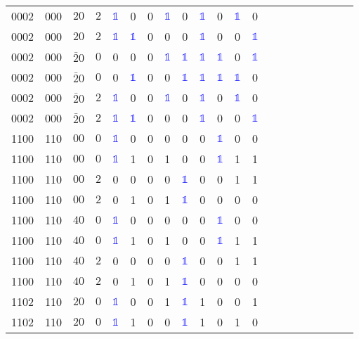 \begin{longtable*}{c| cccccccccccccccccccc }
0002& 000& $20$& $2$& \textcolor{blue}{$\mathds{1}$}& 0& 0& \textcolor{blue}{$\mathds{1}$}& 0& \textcolor{blue}{$\mathds{1}$}& 0& \textcolor{blue}{$\mathds{1}$}& 0\\
0002& 000& $20$& $2$& \textcolor{blue}{$\mathds{1}$}& \textcolor{blue}{$\mathds{1}$}& 0& 0& 0& \textcolor{blue}{$\mathds{1}$}& 0& 0& \textcolor{blue}{$\mathds{1}$}\\
0002& 000& $\bar{2}0$& $0$& 0& 0& 0& \textcolor{blue}{$\mathds{1}$}& \textcolor{blue}{$\mathds{1}$}& \textcolor{blue}{$\mathds{1}$}& \textcolor{blue}{$\mathds{1}$}& 0& \textcolor{blue}{$\mathds{1}$}\\
0002& 000& $\bar{2}0$& $0$& 0& \textcolor{blue}{$\mathds{1}$}& 0& 0& \textcolor{blue}{$\mathds{1}$}& \textcolor{blue}{$\mathds{1}$}& \textcolor{blue}{$\mathds{1}$}& \textcolor{blue}{$\mathds{1}$}& 0\\
0002& 000& $\bar{2}0$& $2$& \textcolor{blue}{$\mathds{1}$}& 0& 0& \textcolor{blue}{$\mathds{1}$}& 0& \textcolor{blue}{$\mathds{1}$}& 0& \textcolor{blue}{$\mathds{1}$}& 0\\
0002& 000& $\bar{2}0$& $2$& \textcolor{blue}{$\mathds{1}$}& \textcolor{blue}{$\mathds{1}$}& 0& 0& 0& \textcolor{blue}{$\mathds{1}$}& 0& 0& \textcolor{blue}{$\mathds{1}$}\\
1100& 110& $00$& $0$& \textcolor{blue}{$\mathds{1}$}& 0& 0& 0& 0& 0& \textcolor{blue}{$\mathds{1}$}& 0& 0\\
1100& 110& $00$& $0$& \textcolor{blue}{$\mathds{1}$}& 1& 0& 1& 0& 0& \textcolor{blue}{$\mathds{1}$}& 1& 1\\
1100& 110& $00$& $2$& 0& 0& 0& 0& \textcolor{blue}{$\mathds{1}$}& 0& 0& 1& 1\\
1100& 110& $00$& $2$& 0& 1& 0& 1& \textcolor{blue}{$\mathds{1}$}& 0& 0& 0& 0\\
1100& 110& $40$& $0$& \textcolor{blue}{$\mathds{1}$}& 0& 0& 0& 0& 0& \textcolor{blue}{$\mathds{1}$}& 0& 0\\
1100& 110& $40$& $0$& \textcolor{blue}{$\mathds{1}$}& 1& 0& 1& 0& 0& \textcolor{blue}{$\mathds{1}$}& 1& 1\\
1100& 110& $40$& $2$& 0& 0& 0& 0& \textcolor{blue}{$\mathds{1}$}& 0& 0& 1& 1\\
1100& 110& $40$& $2$& 0& 1& 0& 1& \textcolor{blue}{$\mathds{1}$}& 0& 0& 0& 0\\
1102& 110& $20$& $0$& \textcolor{blue}{$\mathds{1}$}& 0& 0& 1& \textcolor{blue}{$\mathds{1}$}& 1& 0& 0& 1\\
1102& 110& $20$& $0$& \textcolor{blue}{$\mathds{1}$}& 1& 0& 0& \textcolor{blue}{$\mathds{1}$}& 1& 0& 1& 0\\

\end{longtable*}
